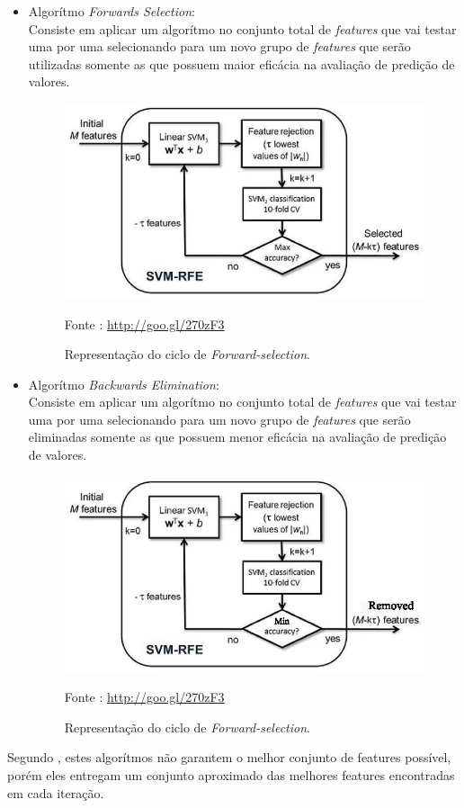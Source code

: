         \begin{itemize}
            \item Algorítmo \textit{Forwards Selection}: \\ Consiste em aplicar um algorítmo no conjunto total de \textit{features} que vai testar uma por uma selecionando para um novo grupo de \textit{features} que serão utilizadas somente as que possuem maior eficácia na avaliação de predição de valores.

            \begin{figure}[ht]
                \centering
                \label{fig06}
                    \includegraphics[keepaspectratio=true, scale=1.2]{editaveis/images/forward-selection.eps}
                \caption{Representação do ciclo de \textit{Forward-selection}.}
                Fonte : \url{http://goo.gl/270zF3}
            \end{figure}

            \item Algorítmo \textit{Backwards Elimination}: \\ Consiste em aplicar um algorítmo no conjunto total de \textit{features} que vai testar uma por uma selecionando para um novo grupo de \textit{features} que serão eliminadas somente as que possuem menor eficácia na avaliação de predição de valores.

            \begin{figure}[ht]
                \centering
                \label{fig06}
                    \includegraphics[keepaspectratio=true, scale=1.2]{editaveis/images/backward-selection.eps}
                \caption{Representação do ciclo de \textit{Forward-selection}.}
                Fonte : \url{http://goo.gl/270zF3}
            \end{figure}

        \end{itemize}

        Segundo \cite{brink2015}, estes algorítmos não garantem o melhor conjunto de features possível, porém eles entregam um conjunto aproximado das melhores features encontradas em cada iteração.

